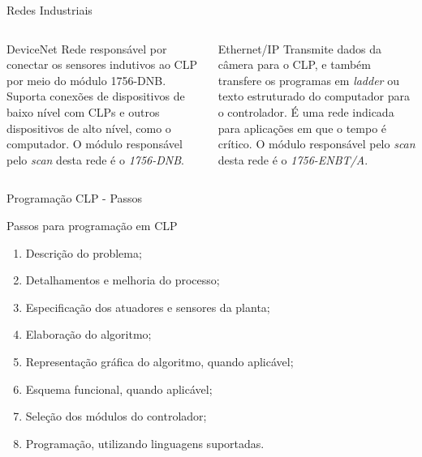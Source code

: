 \documentclass[10pt]{beamer}
\begin{document}
\begin{frame}[fragile]{Redes Industriais}
\begin{columns}[T]
\begin{column}{.5\textwidth}
\begin{block}{DeviceNet}
Rede responsável por conectar os sensores indutivos ao CLP por meio do módulo 1756-DNB. Suporta conexões de dispositivos de baixo nível com CLPs e outros dispositivos de alto nível, como o computador\cite{devicenetrockwell}. O módulo responsável pelo \textit{scan} desta rede é o \textit{1756-DNB}.
\end{block}
\end{column}

\begin{column}{.5\textwidth}
\begin{block}{Ethernet/IP}
Transmite dados da câmera para o CLP, e também transfere os programas em \textit{ladder} ou texto estruturado do computador para o controlador. É uma rede indicada para aplicações em que o tempo é crítico\cite{eiprockwell}. O módulo responsável pelo \textit{scan} desta rede é o \textit{1756-ENBT/A}.
\end{block}
\end{column}

\end{columns}
\end{frame}

\begin{frame}[fragile]{Programação CLP - Passos}
\begin{block}{Passos para programação em CLP}
\begin{enumerate}
  \item Descrição do problema;
  \item Detalhamentos e melhoria do processo;
  \item Especificação dos atuadores e sensores da planta;
  \item Elaboração do algoritmo;
  \item Representação gráfica do algoritmo, quando aplicável;
  \item Esquema funcional, quando aplicável;
  \item Seleção dos módulos do controlador;
  \item Programação, utilizando linguagens suportadas.
\end{enumerate}
\end{block}
\end{frame}
\end{document}
